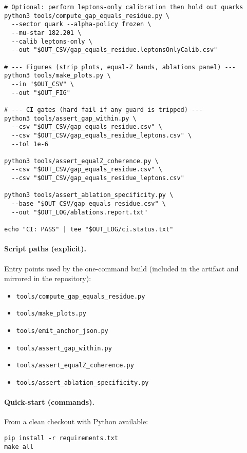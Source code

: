 \documentclass[epjc3]{svjour3}
\begin{document}
\begin{verbatim}
# Optional: perform leptons-only calibration then hold out quarks
python3 tools/compute_gap_equals_residue.py \
  --sector quark --alpha-policy frozen \
  --mu-star 182.201 \
  --calib leptons-only \
  --out "$OUT_CSV/gap_equals_residue.leptonsOnlyCalib.csv"

# --- Figures (strip plots, equal-Z bands, ablations panel) ---
python3 tools/make_plots.py \
  --in "$OUT_CSV" \
  --out "$OUT_FIG"

# --- CI gates (hard fail if any guard is tripped) ---
python3 tools/assert_gap_within.py \
  --csv "$OUT_CSV/gap_equals_residue.csv" \
  --csv "$OUT_CSV/gap_equals_residue_leptons.csv" \
  --tol 1e-6

python3 tools/assert_equalZ_coherence.py \
  --csv "$OUT_CSV/gap_equals_residue.csv" \
  --csv "$OUT_CSV/gap_equals_residue_leptons.csv"

python3 tools/assert_ablation_specificity.py \
  --base "$OUT_CSV/gap_equals_residue.csv" \
  --out "$OUT_LOG/ablations.report.txt"

echo "CI: PASS" | tee "$OUT_LOG/ci.status.txt"
\end{verbatim}

\paragraph{Script paths (explicit).}
Entry points used by the one-command build (included in the artifact and mirrored in the repository):
\begin{itemize}
  \item \texttt{tools/compute\_gap\_equals\_residue.py}
  \item \texttt{tools/make\_plots.py}
  \item \texttt{tools/emit\_anchor\_json.py}
  \item \texttt{tools/assert\_gap\_within.py}
  \item \texttt{tools/assert\_equalZ\_coherence.py}
  \item \texttt{tools/assert\_ablation\_specificity.py}
\end{itemize}

\paragraph{Quick-start (commands).}
From a clean checkout with Python available:
\begin{verbatim}
pip install -r requirements.txt
make all
\end{verbatim}
\end{document}
